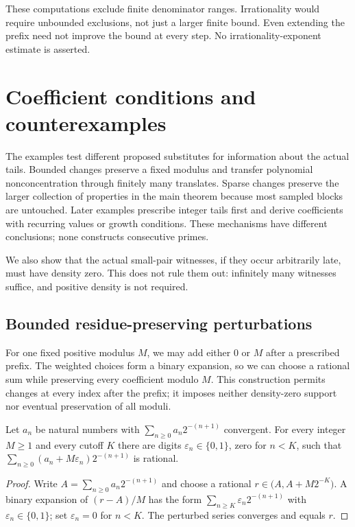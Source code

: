 \documentclass[11pt]{article}
\begin{document}
These computations exclude finite denominator ranges.  Irrationality
would require unbounded exclusions, not just a larger finite bound.
Even extending the prefix need not improve the bound at every step.
No irrationality-exponent estimate is asserted.

\section{Coefficient conditions and counterexamples}\label{long251:sec:obstructions}

The examples test different proposed substitutes for information about
the actual tails.  Bounded changes preserve a fixed modulus and transfer
polynomial nonconcentration through finitely many translates.  Sparse
changes preserve the larger collection of properties in the main theorem
because most sampled blocks are untouched.  Later examples prescribe
integer tails first and derive coefficients with recurring values or
growth conditions.  These mechanisms have different conclusions; none
constructs consecutive primes.

We also show that the actual small-pair witnesses, if they occur
arbitrarily late, must have density zero.  This does not rule them out:
infinitely many witnesses suffice, and positive density is not required.

\subsection{Bounded residue-preserving perturbations}

For one fixed positive modulus $M$, we may add either $0$ or $M$
after a prescribed prefix.  The weighted choices form a binary expansion,
so we can choose a rational sum while preserving every coefficient
modulo $M$.  This construction permits changes at every index after the
prefix; it imposes neither density-zero support nor eventual preservation
of all moduli.

\begin{theorem}\label{long251:res:boundedperturbation}
Let $a_n$ be natural numbers with $\sum_{n\ge0}a_n2^{-(n+1)}$ convergent.  For
every integer $M\ge1$ and every cutoff $K$ there are digits
$\varepsilon_n\in\{0,1\}$, zero for $n<K$, such that
$\sum_{n\ge0}(a_n+M\varepsilon_n)2^{-(n+1)}$ is rational.
\end{theorem}

\begin{proof}
Write $A=\sum_{n\ge0}a_n2^{-(n+1)}$ and choose a rational
$r\in\bigl(A,A+M2^{-K}\bigr)$.  A binary expansion of $(r-A)/M$ has the form
$\sum_{n\ge K}\varepsilon_n2^{-(n+1)}$ with $\varepsilon_n\in\{0,1\}$; set
$\varepsilon_n=0$ for $n<K$.  The perturbed series converges and equals $r$.
\end{proof}
\end{document}
